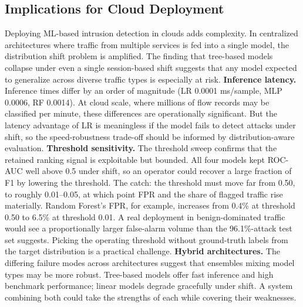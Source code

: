 \documentclass[10pt]{article}
\begin{document}
\subsection{Implications for Cloud Deployment}
Deploying ML-based intrusion detection in clouds adds complexity. In centralized architectures where traffic from multiple services is fed into a single model, the distribution shift problem is amplified. The finding that tree-based models collapse under even a single session-based shift suggests that any model expected to generalize across diverse traffic types is especially at risk.
\textbf{Inference latency.} Inference times differ by an order of magnitude (LR 0.0001 ms/sample, MLP 0.0006, RF 0.0014). At cloud scale, where millions of flow records may be classified per minute, these differences are operationally significant. But the latency advantage of LR is meaningless if the model fails to detect attacks under shift, so the speed-robustness trade-off should be informed by distribution-aware evaluation.
\textbf{Threshold sensitivity.} The threshold sweep confirms that the retained ranking signal is exploitable but bounded. All four models kept ROC-AUC well above 0.5 under shift, so an operator could recover a large fraction of F1 by lowering the threshold. The catch: the threshold must move far from 0.50, to roughly 0.01--0.05, at which point FPR and the share of flagged traffic rise materially. Random Forest's FPR, for example, increases from 0.4\% at threshold 0.50 to 6.5\% at threshold 0.01. A real deployment in benign-dominated traffic would see a proportionally larger false-alarm volume than the 96.1\%-attack test set suggests. Picking the operating threshold without ground-truth labels from the target distribution is a practical challenge.
\textbf{Hybrid architectures.} The differing failure modes across architectures suggest that ensembles mixing model types may be more robust. Tree-based models offer fast inference and high benchmark performance; linear models degrade gracefully under shift. A system combining both could take the strengths of each while covering their weaknesses.
\end{document}
